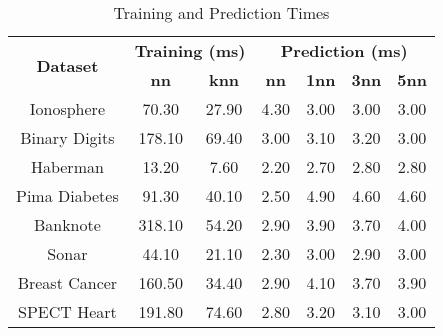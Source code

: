 \begin{table}[htbp]
\caption{Training and Prediction Times}
\begin{center}
\begin{tabular}{|c|c|c|c|c|c|c|}
\hline
\multirow{2}{*}{\textbf{Dataset}} & \multicolumn{2}{c|}{\textbf{Training (ms)}} & \multicolumn{4}{c|}{\textbf{Prediction (ms)}} \\ \cline{2-7}
 & \textbf{nn} & \textbf{knn} & \textbf{nn} & \textbf{1nn} & \textbf{3nn} & \textbf{5nn} \\ \hline
Ionosphere & 70.30 & 27.90 & 4.30 & 3.00 & 3.00 & 3.00 \\ \hline
Binary Digits & 178.10 & 69.40 & 3.00 & 3.10 & 3.20 & 3.00 \\ \hline
Haberman & 13.20 & 7.60 & 2.20 & 2.70 & 2.80 & 2.80 \\ \hline
Pima Diabetes & 91.30 & 40.10 & 2.50 & 4.90 & 4.60 & 4.60 \\ \hline
Banknote & 318.10 & 54.20 & 2.90 & 3.90 & 3.70 & 4.00 \\ \hline
Sonar & 44.10 & 21.10 & 2.30 & 3.00 & 2.90 & 3.00 \\ \hline
Breast Cancer & 160.50 & 34.40 & 2.90 & 4.10 & 3.70 & 3.90 \\ \hline
SPECT Heart & 191.80 & 74.60 & 2.80 & 3.20 & 3.10 & 3.00 \\ \hline
\end{tabular}
\label{tab:timing}
\end{center}
\end{table}